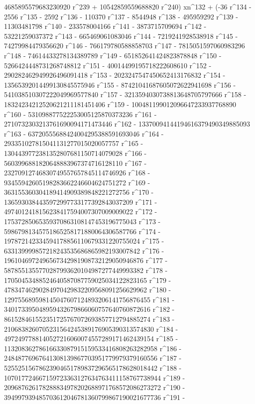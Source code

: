        4685895579683230920 r^239 + 
       10542859559688820 r^240) xn^132 + (-36 r^134 - 2556 r^135 - 
       2592 r^136 - 110370 r^137 - 8544948 r^138 - 495959292 r^139 - 
       11303481798 r^140 - 233578004166 r^141 - 3873715709694 r^142 - 
       53221259037372 r^143 - 665469061083046 r^144 - 
       7219241928538918 r^145 - 74279984479356620 r^146 - 
       766179780588858703 r^147 - 7815051597060983296 r^148 - 
       74614433278134389789 r^149 - 651852641424823878848 r^150 - 
       5266424448731268748812 r^151 - 40014499195718222608610 r^152 - 
       290282462949926496091418 r^153 - 
       2023247547450652413176832 r^154 - 
       13565392014499130845575946 r^155 - 
       87421041687605072622941698 r^156 - 
       541038510307222049969577840 r^157 - 
       3213594030738813648705797666 r^158 - 
       18324234212520621211181451406 r^159 - 
       100481199012096647233937768890 r^160 - 
       531098877522253005125870373236 r^161 - 
       2710732303213761690094171473446 r^162 - 
       13370094144194616379490349885093 r^163 - 
       63720555688424004295388591693046 r^164 - 
       293351027815041131277015020057757 r^165 - 
       1304439772381352807681150714079028 r^166 - 
       5603996881820648883967374716128110 r^167 - 
       23270912746830749557657845114746926 r^168 - 
       93455942605198283662246604624751272 r^169 - 
       363155360304189414909389848221272756 r^170 - 
       1365930384435972997733177392843037209 r^171 - 
       4974012418156238417594007307009009022 r^172 - 
       17537285065359370863108147453196775043 r^173 - 
       59867981345751865258171880064306587766 r^174 - 
       197872142334594178856110679331220755024 r^175 - 
       633139999857218243535686865982193007842 r^176 - 
       1961046972496567342981908732129050946876 r^177 - 
       5878551355770287993620104987277449993382 r^178 - 
       17050453488524640587087759025034122823165 r^179 - 
       47834746290284970429832209568091256629962 r^180 - 
       129755689598145047607124893206141756876455 r^181 - 
       340173395048959432679866060757640760872616 r^182 - 
       861528461552351725767072693857712794885274 r^183 - 
       2106838260705231564245389176905390313574830 r^184 - 
       4972497788140527216060074557289171462439154 r^185 - 
       11320836278616633087915159533416808263282958 r^186 - 
       24848776967641308139867703951779979379160556 r^187 - 
       52552515678623904651789837296565178628018442 r^188 - 
       107017724667159723363127634763411158767738944 r^189 - 
       209687626178288834978202688971768572086273272 r^190 - 
       394997939485703612046781360799867190021677736 r^191 - 
